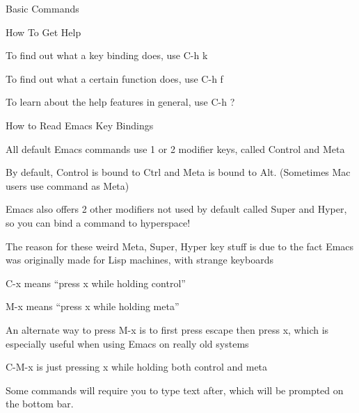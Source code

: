 \documentclass[presentation]{beamer}
\begin{document}
\begin{frame}[label=sec-2]{Basic Commands}
\begin{block}{How To Get Help}
\begin{block}{To find out what a key binding does, use C-h k}
\end{block}
\begin{block}{To find out what a certain function does, use C-h f}
\end{block}
\begin{block}{To learn about the help features in general, use C-h ?}
\end{block}
\end{block}
\begin{block}{How to Read Emacs Key Bindings}
\begin{block}{All default Emacs commands use 1 or 2 modifier keys, called Control and Meta}
\end{block}
\begin{block}{By default, Control is bound to Ctrl and Meta is bound to Alt. (Sometimes Mac users use command as Meta)}
\end{block}
\begin{block}{Emacs also offers 2 other modifiers not used by default called Super and Hyper, so you can bind a command to hyperspace!}
\end{block}
\begin{block}{The reason for these weird Meta, Super, Hyper key stuff is due to the fact Emacs was originally made for Lisp machines, with strange keyboards}
\end{block}
\begin{block}{C-x means ``press x while holding control''}
\end{block}
\begin{block}{M-x means ``press x while holding meta''}
\begin{block}{An alternate way to press M-x is to first press escape then press x, which is especially useful when using Emacs on really old systems}
\end{block}
\end{block}
\begin{block}{C-M-x is just pressing x while holding both control and meta}
\end{block}
\begin{block}{Some commands will require you to type text after, which will be prompted on the bottom bar.}
\end{block}
\end{block}

\end{frame}
\end{document}
